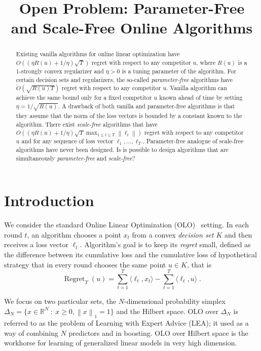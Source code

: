 \documentclass{colt2016} %
\title{Open Problem: Parameter-Free and Scale-Free Online Algorithms}
\DeclareMathOperator{\Regret}{Regret}
\newcommand{\R}{\mathbb{R}}     %
\newcommand{\norm}[1]{\left\|{#1}\right\|}
\begin{document}
\maketitle

\begin{abstract}
Existing vanilla algorithms for online linear optimization have $O((\eta R(u) +
1/\eta) \sqrt{T})$ regret with respect to any competitor $u$, where $R(u)$ is a
$1$-strongly convex regularizer and $\eta > 0$ is a tuning parameter of the
algorithm. For certain decision sets and regularizers, the so-called
\emph{parameter-free} algorithms have $\widetilde O(\sqrt{R(u) T})$ regret with
respect to any competitor $u$.  Vanilla algorithm can achieve the same bound
only for a fixed competitor $u$ known ahead of time by setting $\eta =
1/\sqrt{R(u)}$. A drawback of both vanilla and parameter-free algorithms is
that they assume that the norm of the loss vectors is bounded by a constant
known to the algorithm. There exist \emph{scale-free} algorithms that have
$O((\eta R(u) + 1/\eta) \sqrt{T} \max_{1 \le t \le T} \norm{\ell_t})$ regret
with respect to any competitor $u$ and for any sequence of loss vector $\ell_1,
\dots, \ell_T$. Parameter-free analogue of scale-free algorithms have never
been designed. Is is possible to design algorithms that are simultaneously
\emph{parameter-free} and \emph{scale-free}?
\end{abstract}

\section{Introduction}

We consider the standard Online Linear Optimization (OLO)~\citep{Cesa-Bianchi-Lugosi-2006,
Shalev-Shwartz-2011} setting. In each round $t$, an algorithm chooses a point $x_t$ from a convex \emph{decision set}
$K$ and then receives a loss vector $\ell_t$. Algorithm's goal is to keep its
\emph{regret} small, defined as the difference between its cumulative loss and the cumulative loss of hypothetical strategy that
in every round chooses the same point $u \in K$, that is
$$
\Regret_T(u) = \sum_{t=1}^T \langle \ell_t, x_t \rangle - \sum_{t=1}^T \langle \ell_t, u \rangle \; .
$$

We focus on two particular sets,
the $N$-dimensional probability simplex $\Delta_N = \{ x \in
\R^N ~:~ x \ge 0, \norm{x}_1 = 1\}$ 
and the Hilbert space. OLO over $\Delta_N$
is referred to as the problem of Learning with Expert Advice (LEA); it used as
a way of combining $N$ predictors and in boosting. OLO over Hilbert space is
the workhorse for learning of generalized linear models in very high dimension.
\end{document}

